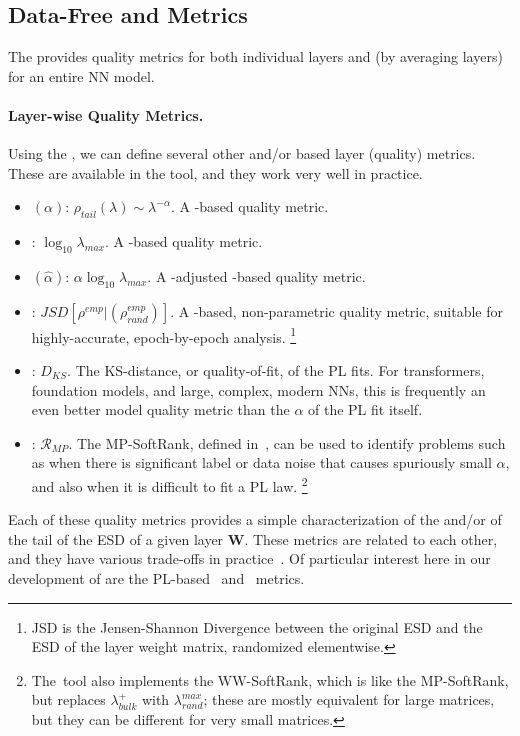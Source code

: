 
\subsection{Data-Free \SHAPE and \SCALE \Quality Metrics}
\label{sxn:htsr-metics}

The \HTSR \Phenomenology provides quality metrics for both individual layers and (by averaging layers) for an entire NN model.

\paragraph{Layer-wise Quality Metrics.}
Using the \HTSR \Phenomenology, we can define several other \SHAPE and/or \SCALE based layer (quality) metrics.
These are available in the \WW tool, and they work very well in practice.
\begin{itemize}
\item 
\ALPHA 
$(\alpha)$: $\rho_{tail}(\lambda)\sim\lambda^{-\alpha}$. 
A \SHAPE-based quality metric.
\item
\LOGSPECTRALNORM: $\log_{10}\lambda_{max}$.
A \SCALE-based quality metric.
\item 
\ALPHAHAT 
$(\hat{\alpha})$: $\alpha\log_{10}\lambda_{max}$.
A \SCALE-adjusted \SHAPE-based quality metric.
\item
\RANDDIST: $JSD[\rho^{emp}|(\rho_{rand}^{emp})]$.
A \SHAPE-based, non-parametric quality metric, suitable for highly-accurate, epoch-by-epoch analysis.%
\footnote{JSD is the Jensen-Shannon Divergence between the original ESD and the ESD of the layer weight matrix, randomized elementwise.}
\item
\PLKS: $D_{KS}$.
The KS-distance, or quality-of-fit, of the PL fits.  
For transformers, foundation models, and large, complex, modern NNs, this is frequently an even better model quality metric than the $\alpha$ of the PL fit itself.
\item
\MPSOFTRANK: $\mathcal{R}_{MP}$.
The MP-SoftRank, defined in~\cite{MM18_TR_JMLRversion}, can be used to identify problems such as when there is significant label or data noise that causes spuriously small $\alpha$, and also when it is difficult to fit a PL law.%
\footnote{The~\WW tool also implements the WW-SoftRank, which is like the MP-SoftRank, but replaces $\lambda_{bulk}^{+}$ with $\lambda_{rand}^{max}$; these are mostly equivalent for large matrices, but they can be different for very small matrices.}
\end{itemize}

\noindent
Each of these quality metrics provides a simple characterization of the \SHAPE and/or \SCALE of the tail of the ESD of a given layer $\mathbf{W}$.
These metrics are related to each other, and they have various trade-offs in practice~\cite{MM20a_trends_NatComm, MM21a_simpsons_TR, YTHx23_KDD}.
Of particular interest here in our development of \SETOL are the PL-based \WW~\ALPHA and  \ALPHAHAT~metrics.



